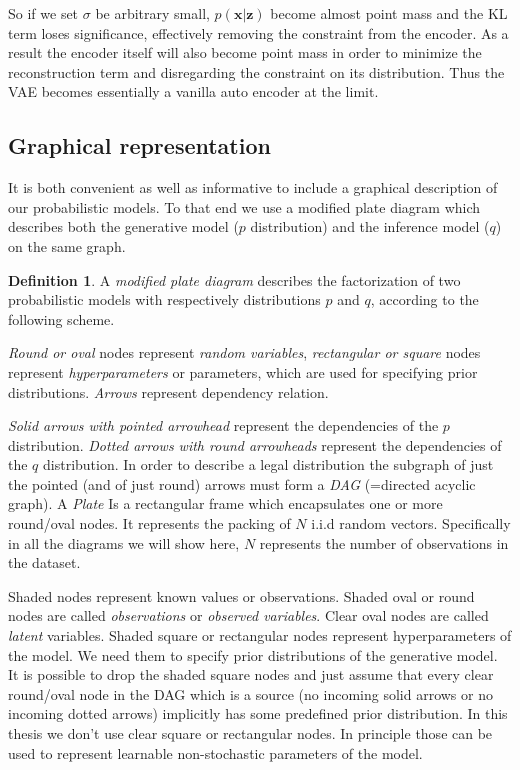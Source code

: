 \documentclass[11pt, a4paper]{report}
\theoremstyle{plain}
\theoremstyle{definition}
\newtheorem{mydef}{Definition}[chapter]
\theoremstyle{remark}
\newcommand{\x}{\mathbf{x}}
\newcommand{\z}{\mathbf{z}}
\begin{document}
So if we set $\sigma$ be arbitrary small, $p(\x | \z)$ become almost point mass
and the KL term loses significance, effectively removing the constraint from the
encoder. As a result the encoder itself
will also become point mass in order to minimize the reconstruction term and
disregarding the constraint on its distribution.
Thus the VAE becomes essentially a vanilla auto encoder at the limit.

\subsection{Graphical representation}
\label{sseq:graphical_representation}

It is both convenient as well as informative to include a graphical description
of our probabilistic models. To that end we use a modified plate diagram which describes
both the generative model ($p$ distribution) and the inference model ($q$) on
the same graph.

\begin{mydef}
\label{def:platediagram}
A \emph{modified plate diagram} describes the factorization of two probabilistic
models with respectively
distributions $p$ and $q$, according to the following scheme.

\emph{Round or oval} nodes represent \emph{random variables}, \emph{rectangular
or square} nodes represent \emph{hyperparameters} or parameters, which are used
for specifying prior distributions.
\emph{Arrows} represent
dependency relation.

\emph{Solid arrows with pointed arrowhead} represent the dependencies of the $p$
distribution. \emph{Dotted arrows with round arrowheads} represent the dependencies of
the $q$ distribution.
In order to describe a legal distribution the subgraph of just the pointed
(and of just round) arrows must form a \emph{DAG} (=directed acyclic graph).
A \emph{Plate} Is a rectangular frame which encapsulates one or more round/oval
nodes. It represents the packing of $N$ i.i.d random vectors.
Specifically in all the diagrams we will show here, $N$ represents the number
of observations in the dataset.

Shaded nodes represent known values or observations.
Shaded oval or round nodes are called \emph{observations} or \emph{observed
variables}.
Clear oval nodes are called \emph{latent} variables. 
Shaded square or rectangular nodes represent hyperparameters of the model.
We need them to specify prior distributions of the generative model.
It is possible to drop the shaded square nodes and just assume that
every clear round/oval node in the DAG which is a source (no incoming solid arrows or no
incoming dotted arrows) implicitly has some predefined prior distribution.
In this thesis we don't use clear square or rectangular nodes.
In principle those can be used to represent learnable non-stochastic parameters of the model.
\end{mydef}
\end{document}
